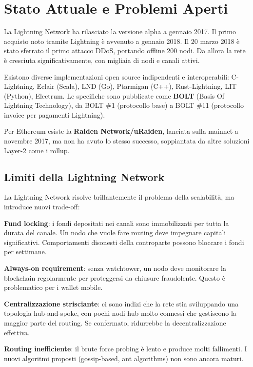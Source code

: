 \documentclass[
  italian,
  openany]{book}
\begin{document}
\section{Stato Attuale e Problemi
Aperti}\label{stato-attuale-e-problemi-aperti}

La Lightning Network ha rilasciato la versione alpha a gennaio 2017. Il
primo acquisto noto tramite Lightning è avvenuto a gennaio 2018. Il 20
marzo 2018 è stato sferrato il primo attacco DDoS, portando offline 200
nodi. Da allora la rete è cresciuta significativamente, con migliaia di
nodi e canali attivi.

Esistono diverse implementazioni open source indipendenti e
interoperabili: C-Lightning, Eclair (Scala), LND (Go), Ptarmigan (C++),
Rust-Lightning, LIT (Python), Electrum. Le specifiche sono pubblicate
come \textbf{BOLT} (Basis Of Lightning Technology), da BOLT \#1
(protocollo base) a BOLT \#11 (protocollo invoice per pagamenti
Lightning).

Per Ethereum esiste la \textbf{Raiden Network/uRaiden}, lanciata sulla
mainnet a novembre 2017, ma non ha avuto lo stesso successo, soppiantata
da altre soluzioni Layer-2 come i rollup.

\subsection{Limiti della Lightning
Network}\label{limiti-della-lightning-network}

La Lightning Network risolve brillantemente il problema della
scalabilità, ma introduce nuovi trade-off:

\textbf{Fund locking}: i fondi depositati nei canali sono immobilizzati
per tutta la durata del canale. Un nodo che vuole fare routing deve
impegnare capitali significativi. Comportamenti disonesti della
controparte possono bloccare i fondi per settimane.

\textbf{Always-on requirement}: senza watchtower, un nodo deve
monitorare la blockchain regolarmente per proteggersi da chiusure
fraudolente. Questo è problematico per i wallet mobile.

\textbf{Centralizzazione strisciante}: ci sono indizi che la rete stia
sviluppando una topologia hub-and-spoke, con pochi nodi hub molto
connessi che gestiscono la maggior parte del routing. Se confermato,
ridurrebbe la decentralizzazione effettiva.

\textbf{Routing inefficiente}: il brute force probing è lento e produce
molti fallimenti. I nuovi algoritmi proposti (gossip-based, ant
algorithms) non sono ancora maturi.
\end{document}
